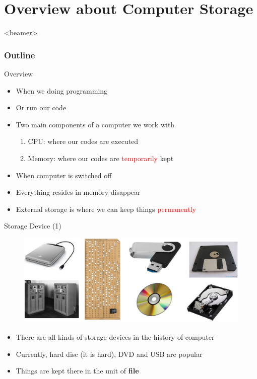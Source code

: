 \section{Overview about Computer Storage}
\label{sec:overview}
\begin{frame}<beamer>
    \frametitle{Outline}
    \tableofcontents[currentsection]
\end{frame}

\begin{frame}{Overview}
\begin{itemize}
	\item {When we doing programming}
	\item {Or run our code}
	\item {Two main components of a computer we work with}
	\begin{enumerate}
		\item {CPU: where our codes are executed}
		\item {Memory: where our codes are \textcolor{red}{temporarily} kept}
	\end{enumerate}
	\item {When computer is switched off}
	\item {Everything resides in memory disappear}
	\item {External storage is where we can keep things \textcolor{red}{permanently}}
\end{itemize}
\end{frame}

\begin{frame}{Storage Device (1)}
\begin{figure}
	\includegraphics[width=0.9\linewidth]{figs/storages.pdf}
\end{figure}
\begin{itemize}
	\item {There are all kinds of storage devices in the history of computer}
	\item {Currently, hard disc (it is hard), DVD and USB are popular}
	\item {Things are kept there in the unit of \textbf{file}}
\end{itemize}
\end{frame}

